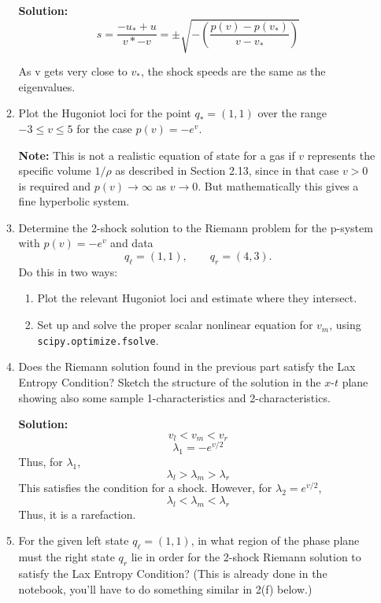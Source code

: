 \documentclass[11pt]{article}
\begin{document}
\begin{enumerate}
\begin{enumerate}
\vskip 1cm
{\bf Solution:}
\[ s= \frac{-u_*+u}{v*-v}=\pm \sqrt{-\left( \frac{p(v)-p(v_*)}{v-v_*} \right)}\]

As v gets very close to $v_*$, the shock speeds are the same as the eigenvalues.
\item Plot the Hugoniot loci for the point $q_* = (1,1)$ over the range
$-3\leq v \leq 5$ for the case $p(v) = -e^v$.

{\bf Note:} This is not a realistic equation of state for a gas if $v$
represents the specific volume $1/\rho$ as described in Section 2.13, since
in that case $v>0$ is required and $p(v) \rightarrow \infty$ as
$v\rightarrow 0$.  But mathematically this gives a fine hyperbolic system.

\item Determine the 2-shock solution to the Riemann problem for the p-system
with $p(v) = -e^v$ and data
\[
q_\ell = (1,1), \qquad q_r = (4,3).
\]
Do this in two ways:
 \begin{enumerate} 
 \item Plot the relevant Hugoniot loci and estimate where they intersect.
 \item Set up and solve the proper scalar nonlinear equation for $v_m$, 
 using \verb+scipy.optimize.fsolve+.
 \end{enumerate} 

\item Does the Riemann solution found in the previous part
satisfy the Lax Entropy
Condition?  Sketch the structure of the solution in the $x$-$t$ plane
showing also some sample 1-characteristics and 2-characteristics.

\vskip 1cm
{\bf Solution:}
\[v_l<v_m<v_r\]
\[ \lambda_1 = -e^{v/2} \]
Thus, for $\lambda_1$,
 \[ \lambda_l>\lambda_m>\lambda_r\]
 This satisfies the condition for a shock.
 However,
 for $\lambda_2  = e^{v/2}$,
 \[ \lambda_l<\lambda_m<\lambda_r\]
 Thus, it is a rarefaction.


\item For the given left state $q_\ell = (1,1)$, in what region of the phase 
plane must the
right state $q_r$ lie in order for the 2-shock Riemann solution to satisfy
the Lax Entropy Condition?  
(This is already done in the notebook, you'll have to do something similar
in 2(f) below.)

\end{enumerate} 






\end{enumerate}
\end{document}
